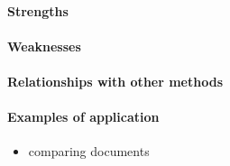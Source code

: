 \paragraph{Strengths}
\paragraph{Weaknesses}
\paragraph{Relationships with other methods}
\paragraph{Examples of application}
\begin{itemize}
    \item comparing documents
\end{itemize}


